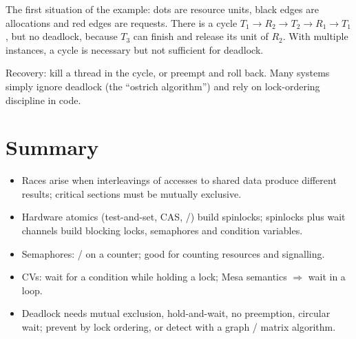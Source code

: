 \begin{center}
\end{center}
The first situation of the example: dots are resource units, black edges
are allocations and red edges are requests. There is a cycle
$T_1\to R_2\to T_2\to R_1\to T_1$, but no deadlock, because $T_3$ can finish
and release its unit of $R_2$. With multiple instances, a cycle is necessary
but not sufficient for deadlock.

Recovery: kill a thread in the cycle, or preempt and roll back. Many systems simply ignore
deadlock (the ``ostrich algorithm'') and rely on lock-ordering discipline in code.

\section*{Summary}
\begin{itemize}
  \item Races arise when interleavings of accesses to shared data produce different results;
    critical sections must be mutually exclusive.
  \item Hardware atomics (test-and-set, CAS, /) build spinlocks; spinlocks
    plus wait channels build blocking locks, semaphores and condition variables.
  \item Semaphores: / on a counter; good for counting resources and signalling.
  \item CVs: wait for a condition while holding a lock; Mesa semantics $\Rightarrow$ wait in a
     loop.
  \item Deadlock needs mutual exclusion, hold-and-wait, no preemption, circular wait; prevent by
    lock ordering, or detect with a graph / matrix algorithm.
\end{itemize}
